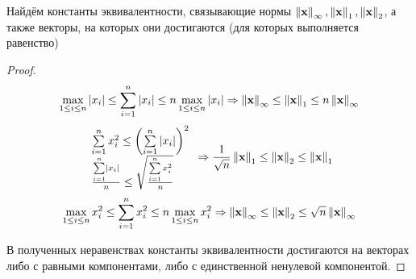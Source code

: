 \begin{example}
  Найдём константы эквивалентности, связывающие нормы $\left\lVert\mathbf{x}\right\rVert_{\infty}, \left\lVert\mathbf{x}\right\rVert_{1}, \left\lVert\mathbf{x}\right\rVert_{2}$, а также векторы, на которых они достигаются (для которых выполняется равенство)
  \begin{proof}
    \begin{equation}
      \max\limits_{1 \le i \le n} \left\lvert x_i\right\rvert \le \sum\limits_{i=1}^{n} \left\lvert x_i\right\rvert \le n \max\limits_{1 \le i \le n} \left\lvert x_i\right\rvert \Rightarrow \left\lVert\mathbf{x}\right\rVert_{\infty} \le \left\lVert\mathbf{x}\right\rVert_{1} \le n \left\lVert\mathbf{x}\right\rVert_{\infty}
    \end{equation}
    \begin{equation}
      \begin{array}{l}
        \sum\limits_{i=1}^{n} x_i^2 \le \left( \sum\limits_{i=1}^{n} \left\lvert x_i\right\rvert \right)^2 \\
        \frac{\sum\limits_{i=1}^n\left\lvert x_i\right\rvert}{n}\leq\sqrt{\frac{\sum\limits_{i=1}^nx_i^2}{n}}
      \end{array}
      \Rightarrow \frac{1}{\sqrt{n}} \left\lVert\mathbf{x}\right\rVert_{1} \le \left\lVert\mathbf{x}\right\rVert_{2} \le \left\lVert\mathbf{x}\right\rVert_{1}
    \end{equation}
    \begin{equation}
      \max\limits_{1 \le i \le n} x_i^2 \le \sum\limits_{i=1}^{n} x_i^2 \le n \max\limits_{1 \le i \le n} x_i^2 \Rightarrow \left\lVert\mathbf{x}\right\rVert_{\infty} \le \left\lVert\mathbf{x}\right\rVert_{2} \le \sqrt{n}\left\lVert\mathbf{x}\right\rVert_{\infty}
    \end{equation}

    В полученных неравенствах константы эквивалентности достигаются на векторах либо с равными компонентами, либо с единственной ненулевой компонентой.
  \end{proof}
\end{example}

